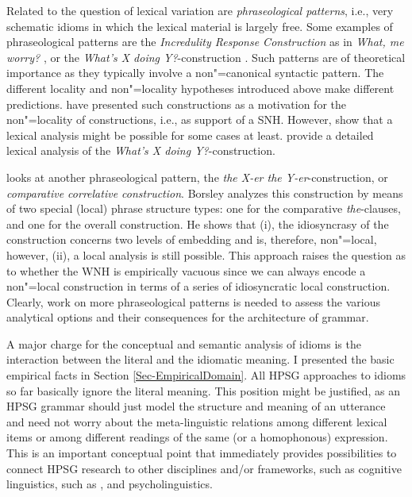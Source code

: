 \documentclass[output=paper]{langsci/langscibook}
\begin{document}
 

Related to the question of lexical variation are \emph{phraseological patterns}, i.e., very schematic idioms 
in which the lexical material is largely free. Some examples 
of phraseological patterns are
  the \emph{Incredulity Response Construction} as in \emph{What, me worry?} \citep{Akmajian:84,Lambrecht:90}, 
or the \emph{What's X doing Y?}-construction \citep{KF99a}.
Such patterns are of theoretical importance as they typically involve a non"=canonical syntactic pattern. 
The different locality and non"=locality hypotheses introduced above make different predictions. 
\cite{FKoC88a} have presented such constructions as a motivation for the non"=locality of constructions, i.e., as support of a SNH. However, \cite{KF99a} show that a lexical analysis might be possible for some cases at least. 
\citeauthor{KF99a} provide a detailed lexical analysis of the \emph{What's X doing Y?}-construction. 

\cite{Borsley:04} looks at another phraseological pattern, the \emph{the X-er the Y-er}-construction, or \emph{comparative correlative construction}.
Borsley analyzes this construction by means of two special (local) phrase structure types: one for the comparative \emph{the}-clauses, and one for the overall construction. He shows that (i), the idiosyncrasy of the construction concerns two levels of embedding and is, therefore, non"=local, however, (ii),
a local analysis is still possible. This approach raises the question as to whether the WNH is empirically vacuous since we can always encode a non"=local construction in terms of a series of idiosyncratic local construction. 
Clearly, work on more phraseological patterns is needed to assess the various analytical options and their consequences for the architecture of grammar.


A major charge for the conceptual and semantic analysis of idioms is the interaction between the literal and the idiomatic meaning. 
I presented the basic empirical facts in Section \ref{Sec-EmpiricalDomain}. 
All HPSG approaches to idioms so far basically ignore the literal meaning.
This position might be justified, as  an HPSG grammar should just model the structure and meaning of an utterance and need not worry about the meta-linguistic relations among different lexical items or among different readings of the same (or a homophonous) expression.
This is an important conceptual point that immediately provides possibilities to connect HPSG research to other disciplines and/or frameworks, such as cognitive linguistics, such as \cite{Dobrovolskij:Piirainen:05}, and psycholinguistics.
\end{document}
